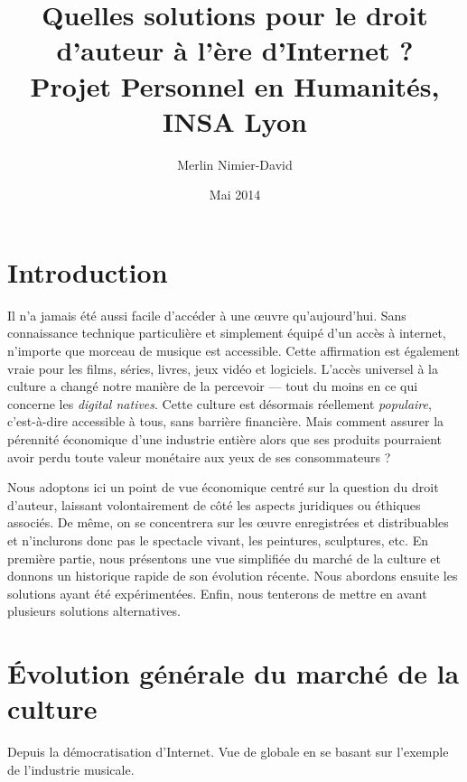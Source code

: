 \documentclass[a4paper]{report}
\title{
	Quelles solutions pour le droit d'auteur à l'ère d'Internet ?\\
	Projet Personnel en Humanités, INSA Lyon
}
\author{Merlin Nimier-David}
\date{Mai 2014}
\begin{document}
	\maketitle

	\tableofcontents




	\chapter{Introduction}
	Il n'a jamais été aussi facile d'accéder à une œuvre qu'aujourd'hui. Sans connaissance technique particulière et simplement équipé d'un accès à internet, n'importe que morceau de musique est accessible. Cette affirmation est également vraie pour les films, séries, livres, jeux vidéo et logiciels. L'accès universel à la culture a changé notre manière de la percevoir — tout du moins en ce qui concerne les \emph{digital natives}. Cette culture est désormais réellement \emph{populaire}, c'est-à-dire accessible à tous, sans barrière financière. Mais comment assurer la pérennité économique d'une industrie entière alors que ses produits pourraient avoir perdu toute valeur monétaire aux yeux de ses consommateurs ?

	Nous adoptons ici un point de vue économique centré sur la question du droit d'auteur, laissant volontairement de côté les aspects juridiques ou éthiques associés. De même, on se concentrera sur les œuvre enregistrées et distribuables et n'inclurons donc pas le spectacle vivant, les peintures, sculptures, etc. En première partie, nous présentons une vue simplifiée du marché de la culture et donnons un historique rapide de son évolution récente. Nous abordons ensuite les solutions ayant été expérimentées. Enfin, nous tenterons de mettre en avant plusieurs solutions alternatives.





	\chapter{Évolution générale du marché de la culture}
	Depuis la démocratisation d'Internet. Vue de globale en se basant sur l'exemple de l'industrie musicale.
\end{document}
